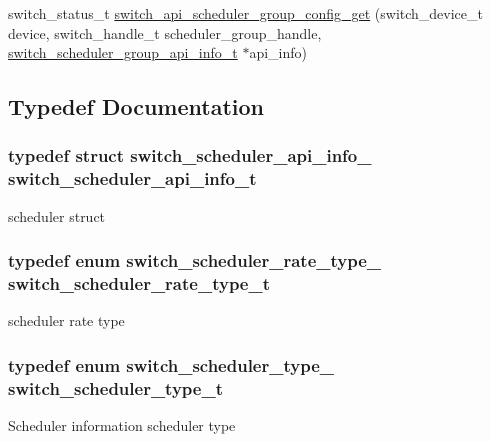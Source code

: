 \begin{DoxyCompactItemize}
\item 
switch\+\_\+status\+\_\+t \hyperlink{group__Scheduler_ga974cf29128c0829978fecae3c3a47250}{switch\+\_\+api\+\_\+scheduler\+\_\+group\+\_\+config\+\_\+get} (switch\+\_\+device\+\_\+t device, switch\+\_\+handle\+\_\+t scheduler\+\_\+group\+\_\+handle, \hyperlink{structswitch__scheduler__group__api__info__}{switch\+\_\+scheduler\+\_\+group\+\_\+api\+\_\+info\+\_\+t} $\ast$api\+\_\+info)
\end{DoxyCompactItemize}


\subsection{Typedef Documentation}
\hypertarget{group__Scheduler_ga3e981ad1a349d10503bfbba6cd3b2f0d}{
\subsubsection[{switch\+\_\+scheduler\+\_\+api\+\_\+info\+\_\+t}]{\setlength{\rightskip}{0pt plus 5cm}typedef struct {\bf switch\+\_\+scheduler\+\_\+api\+\_\+info\+\_\+}  {\bf switch\+\_\+scheduler\+\_\+api\+\_\+info\+\_\+t}}}\label{group__Scheduler_ga3e981ad1a349d10503bfbba6cd3b2f0d}
scheduler struct \hypertarget{group__Scheduler_gafaa6b883d003bac33a4e76086ae90e3b}{
\subsubsection[{switch\+\_\+scheduler\+\_\+rate\+\_\+type\+\_\+t}]{\setlength{\rightskip}{0pt plus 5cm}typedef enum {\bf switch\+\_\+scheduler\+\_\+rate\+\_\+type\+\_\+}  {\bf switch\+\_\+scheduler\+\_\+rate\+\_\+type\+\_\+t}}}\label{group__Scheduler_gafaa6b883d003bac33a4e76086ae90e3b}
scheduler rate type \hypertarget{group__Scheduler_ga62f91884031e17accd1bfa6d07bcddd5}{
\subsubsection[{switch\+\_\+scheduler\+\_\+type\+\_\+t}]{\setlength{\rightskip}{0pt plus 5cm}typedef enum {\bf switch\+\_\+scheduler\+\_\+type\+\_\+}  {\bf switch\+\_\+scheduler\+\_\+type\+\_\+t}}}\label{group__Scheduler_ga62f91884031e17accd1bfa6d07bcddd5}
Scheduler information scheduler type 

